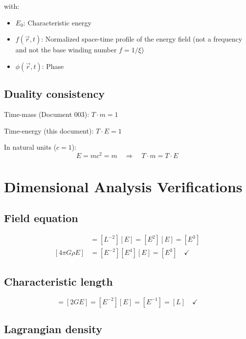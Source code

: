 	with:
	\begin{itemize}
		\item $E_0$: Characteristic energy
		\item $f(\vec{r}, t)$: Normalized space-time profile of the energy field (not a frequency and not the base winding number $f = 1/\xi$)
		\item $\phi(\vec{r}, t)$: Phase
	\end{itemize}
	
	\subsection{Duality consistency}
	
	Time-mass (Document 003): $T \cdot m = 1$
	
	Time-energy (this document): $T \cdot E = 1$
	
	In natural units ($c = 1$):
	\begin{equation}
		E = mc^2 = m \quad \Rightarrow \quad T \cdot m = T \cdot E
	\end{equation}
	
	\section{Dimensional Analysis Verifications}
	\label{sec:dimensional_analysis}
	
	\subsection{Field equation}
	
	\begin{align}
		[\nabla^2 E] &= [L^{-2}][E] = [E^2][E] = [E^3] \\
		[4\pi G \rho E] &= [E^{-2}][E^4][E] = [E^3] \quad \checkmark
	\end{align}
	
	\subsection{Characteristic length}
	
	\begin{equation}
		[r_0] = [2GE] = [E^{-2}][E] = [E^{-1}] = [L] \quad \checkmark
	\end{equation}
	
	\subsection{Lagrangian density}
	
